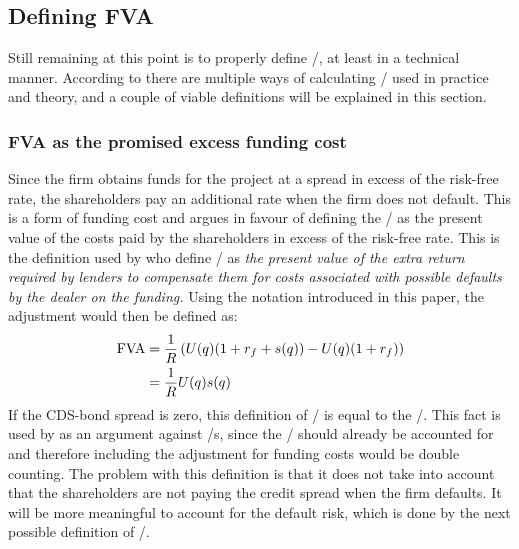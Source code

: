 \documentclass[../main.tex]{subfiles}
\begin{document}
    \subsection{Defining FVA}
    \label{sec:defining-fva}
        Still remaining at this point is to properly define \FVA/, at least in a technical manner.
        According to \textcite{ADS2019} there are multiple ways of calculating \FVA/ used in practice and theory,
        and a couple of viable definitions will be explained in this section.

        \subsubsection*{FVA as the promised excess funding cost}
            Since the firm obtains funds for the project at a spread in excess of the risk-free rate, 
            the shareholders pay an additional rate when the firm does not default. 
            This is a form of funding cost and argues in favour of defining the \FVA/ as
            the present value of the costs paid by the shareholders in excess of the risk-free rate.
            This is the definition used by \textcite{HullWhiteFVA} who define \FVA/ as 
            \textit{
                the present value of the extra return required by lenders to compensate them 
                for costs associated with possible defaults by the dealer on the funding.
            }
            Using the notation introduced in this paper, the adjustment would then be defined as:
                \begin{align}
                    \FVA/ 
                    &= 
                        \discountfactor \left(
                            U(q) (1 + \rfrate + s(q))
                            - U(q) (1 + \rfrate)
                        \right) 
                        \nonumber \\
                    &= 
                        \discountfactor U(q) s(q)
                    \label{eqn:fva-as-promised-excess-funding-cost}
                \end{align}
            If the CDS-bond spread is zero, this definition of \FVA/ is equal to the \DVA/.
            This fact is used by \textcite{HullWhiteFVA} as an argument against \FVA/s,
            since the \DVA/ should already be accounted for and therefore including the adjustment
            for funding costs would be double counting.
            The problem with this definition is that it does not take into account 
            that the shareholders are not paying the credit spread when the firm defaults.
            It will be more meaningful to account for the default risk, 
            which is done by the next possible definition of \FVA/.
\end{document}
